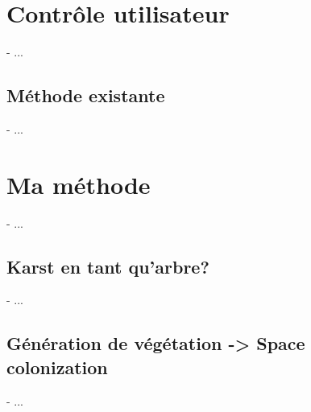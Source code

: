 \section{Contrôle utilisateur}
- ...

\subsection{Méthode existante}
- ...

\section{Ma méthode}
- ...

\subsection{Karst en tant qu'arbre?}
- ...

\subsection{Génération de végétation -> Space colonization}
- ...


